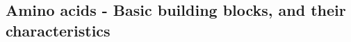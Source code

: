 \subsection{Amino acids - Basic building blocks, and their characteristics}
    
        
    

\begin{lstlisting}
\end{lstlisting}
